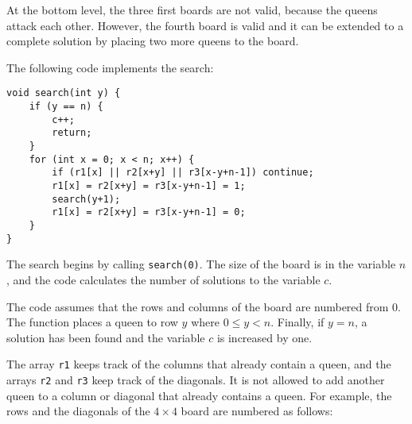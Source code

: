 At the bottom level, the three first boards
are not valid, because the queens attack each other.
However, the fourth board is valid
and it can be extended to a complete solution by
placing two more queens to the board.

\begin{samepage}
The following code implements the search:
\begin{lstlisting}
void search(int y) {
    if (y == n) {
        c++;
        return;
    }
    for (int x = 0; x < n; x++) {
        if (r1[x] || r2[x+y] || r3[x-y+n-1]) continue;
        r1[x] = r2[x+y] = r3[x-y+n-1] = 1;
        search(y+1);
        r1[x] = r2[x+y] = r3[x-y+n-1] = 0;
    }
}
\end{lstlisting}
\end{samepage}
The search begins by calling \texttt{search(0)}.
The size of the board is in the variable $n$,
and the code calculates the number of solutions
to the variable $c$.

The code assumes that the rows and columns
of the board are numbered from 0.
The function places a queen to row $y$
where $0 \le y < n$.
Finally, if $y=n$, a solution has been found
and the variable $c$ is increased by one.

The array \texttt{r1} keeps track of the columns
that already contain a queen,
and the arrays \texttt{r2} and \texttt{r3}
keep track of the diagonals.
It is not allowed to add another queen to a
column or diagonal that already contains a queen. 
For example, the rows and the diagonals of
the $4 \times 4$ board are numbered as follows:

